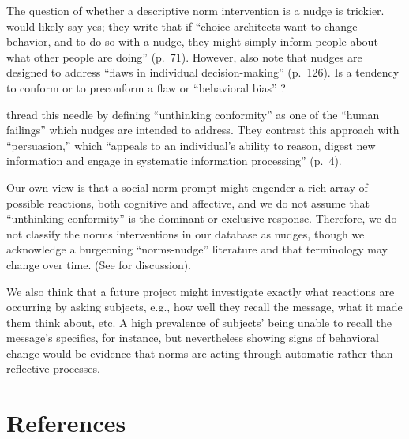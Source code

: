\documentclass[sn-nature,pdflatex]{sn-jnl}
\begin{document}
The question of whether a descriptive norm intervention is a nudge is
trickier. \citep{thaler2009} would likely say yes; they write that if
``choice architects want to change behavior, and to do so with a nudge,
they might simply inform people about what other people are doing''
(p.~71). However, \citep{hausman2010} also note that nudges are designed
to address ``flaws in individual decision-making'' (p.~126). Is a
tendency to conform or to preconform \citep{sparkman2017} a flaw or
``behavioral bias'' \citep[p.~362]{kantorowicz2021}?

\citep{mols2015} thread this needle by defining ``unthinking
conformity'' as one of the ``human failings'' which nudges are intended
to address. They contrast this approach with ``persuasion,'' which
``appeals to an individual's ability to reason, digest new information
and engage in systematic information processing'' (p.~4).

Our own view is that a social norm prompt might engender a rich array of
possible reactions, both cognitive and affective, and we do not assume
that ``unthinking conformity'' is the dominant or exclusive response.
Therefore, we do not classify the norms interventions in our database as
nudges, though we acknowledge a burgeoning ``norms-nudge'' literature
and that terminology may change over time. (See \citep{bicchieri2023}
for discussion).

We also think that a future project might investigate exactly what
reactions are occurring by asking subjects, e.g., how well they recall
the message, what it made them think about, etc. A high prevalence of
subjects' being unable to recall the message's specifics, for instance,
but nevertheless showing signs of behavioral change would be evidence
that norms are acting through automatic rather than reflective
processes.

\newpage

\section{References}\label{references}


\end{document}
